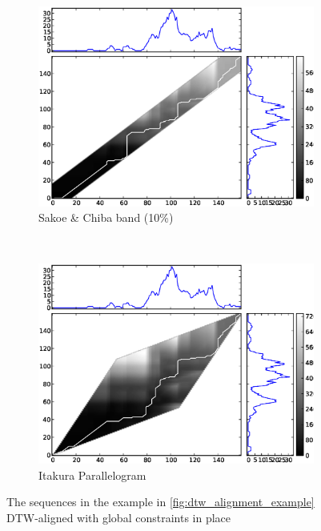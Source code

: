 \documentclass[12pt,a4paper]{article}
\begin{document}
\begin{figure}[t,b]
    \centering
    \begin{subfigure}{\textwidth}
        \includegraphics[width=\textwidth]{images/introduction/dtw_dist_uc003okl_3_uc021uwd_1_sakoe_chiba_16.eps}
        \caption{Sakoe \& Chiba band (10\%)}
        \label{fig:dtw_alignment_example_sc}
    \end{subfigure}
    ~
    \begin{subfigure}{\textwidth}
        \includegraphics[width=\textwidth]{images/introduction/dtw_dist_uc003okl_3_uc021uwd_1_itakura.eps}
        \caption{Itakura Parallelogram}
        \label{fig:dtw_alignment_example_itakura}
    \end{subfigure}
    \caption{The sequences in the example in \ref{fig:dtw_alignment_example} DTW-aligned with global constraints in place}
    \label{fig:dtw_alignment_example_constrained}
\end{figure}
\end{document}
